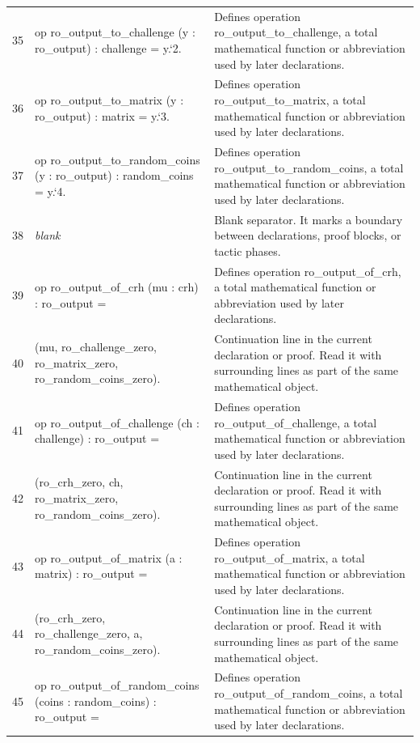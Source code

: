 \documentclass[10pt]{article}
\begin{document}
\begin{longtable}{r L{0.53\textwidth} L{0.37\textwidth}}
35 & {\ttfamily\scriptsize op ro\_output\_to\_challenge (y : ro\_output) : challenge = y.`2.} & Defines operation ro\_output\_to\_challenge, a total mathematical function or abbreviation used by later declarations. \\
36 & {\ttfamily\scriptsize op ro\_output\_to\_matrix (y : ro\_output) : matrix = y.`3.} & Defines operation ro\_output\_to\_matrix, a total mathematical function or abbreviation used by later declarations. \\
37 & {\ttfamily\scriptsize op ro\_output\_to\_random\_coins (y : ro\_output) : random\_coins = y.`4.} & Defines operation ro\_output\_to\_random\_coins, a total mathematical function or abbreviation used by later declarations. \\
38 & {\ttfamily\scriptsize \emph{blank}} & Blank separator.  It marks a boundary between declarations, proof blocks, or tactic phases. \\
39 & {\ttfamily\scriptsize op ro\_output\_of\_crh (mu : crh) : ro\_output =} & Defines operation ro\_output\_of\_crh, a total mathematical function or abbreviation used by later declarations. \\
40 & {\ttfamily\scriptsize   (mu, ro\_challenge\_zero, ro\_matrix\_zero, ro\_random\_coins\_zero).} & Continuation line in the current declaration or proof.  Read it with surrounding lines as part of the same mathematical object. \\
41 & {\ttfamily\scriptsize op ro\_output\_of\_challenge (ch : challenge) : ro\_output =} & Defines operation ro\_output\_of\_challenge, a total mathematical function or abbreviation used by later declarations. \\
42 & {\ttfamily\scriptsize   (ro\_crh\_zero, ch, ro\_matrix\_zero, ro\_random\_coins\_zero).} & Continuation line in the current declaration or proof.  Read it with surrounding lines as part of the same mathematical object. \\
43 & {\ttfamily\scriptsize op ro\_output\_of\_matrix (a : matrix) : ro\_output =} & Defines operation ro\_output\_of\_matrix, a total mathematical function or abbreviation used by later declarations. \\
44 & {\ttfamily\scriptsize   (ro\_crh\_zero, ro\_challenge\_zero, a, ro\_random\_coins\_zero).} & Continuation line in the current declaration or proof.  Read it with surrounding lines as part of the same mathematical object. \\
45 & {\ttfamily\scriptsize op ro\_output\_of\_random\_coins (coins : random\_coins) : ro\_output =} & Defines operation ro\_output\_of\_random\_coins, a total mathematical function or abbreviation used by later declarations. \\

\end{longtable}
\end{document}

